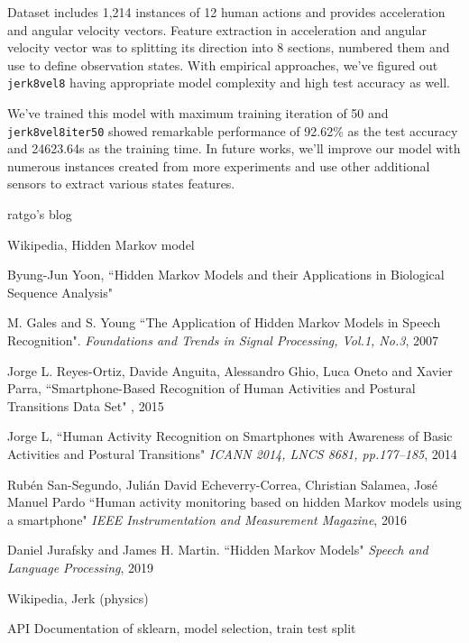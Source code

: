 \documentclass[10pt,twocolumn,letterpaper]{article}
\begin{document}
Dataset includes 1,214 instances of 12 human actions and provides acceleration and angular velocity vectors. Feature extraction in acceleration and angular velocity vector was to splitting its direction into 8 sections, numbered them and use to define observation states. With empirical approaches, we've figured out \texttt{jerk8vel8} having appropriate model complexity and high test accuracy as well.

We've trained this model with maximum training iteration of 50 and \texttt{jerk8vel8iter50} showed remarkable performance of 92.62\% as the test accuracy and 24623.64s as the training time. In future works, we'll improve our model with numerous instances created from more experiments and use other additional sensors to extract various states features.

\begin{thebibliography}{9}

ratgo’s blog

Wikipedia, Hidden Markov model

Byung-Jun Yoon, 
``Hidden Markov Models and their Applications in Biological Sequence Analysis"

M. Gales and S. Young
``The Application of Hidden Markov Models in Speech Recognition".
{\textit{Foundations and Trends in Signal Processing, Vol.1, No.3}, 2007}

Jorge L. Reyes-Ortiz, Davide Anguita, Alessandro Ghio, Luca Oneto and Xavier Parra,
``Smartphone-Based Recognition of Human Activities and Postural Transitions Data Set"
, 2015

Jorge L, \etal
``Human Activity Recognition on Smartphones with Awareness of Basic Activities and Postural Transitions"
{\textit{ICANN 2014, LNCS 8681, pp.177–185}, 2014}

Rubén San-Segundo, Julián David Echeverry-Correa, Christian Salamea, José Manuel Pardo
``Human activity monitoring based on hidden Markov models using a smartphone"
{\textit{IEEE Instrumentation and Measurement Magazine}, 2016}

Daniel Jurafsky and James H. Martin.
``Hidden Markov Models"
{\textit{Speech and Language Processing}, 2019}

Wikipedia, Jerk (physics)

API Documentation of sklearn, model selection, train test split


\end{thebibliography}
\end{document}
